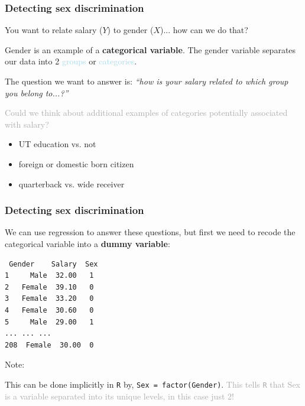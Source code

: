 \documentclass{beamer}
\newcommand{\bo}[1]{\textcolor{burntorange}{#1}}
\newcommand{\lb}[1]{\textcolor{lightblue}{#1}}
\newcommand{\dg}[1]{\textcolor{darkgray}{#1}}
\newcommand{\sk}{\vspace{.5cm}}
\newcommand{\skoo}{\vspace{.2in}}
\begin{document}
\begin{frame}
\frametitle{Detecting sex discrimination}
You want to relate salary ($Y$) to gender ($X$)...  how can we do that?

\skoo

Gender is an example of a {\bo{\bf categorical variable}}. The gender variable separates our data into 2 \lb{groups} or \lb{categories}. \\ \sk 

The question we want to answer is: {\it ``how is your salary related to which group you belong to...?''}  

\skoo \pause

\dg{Could we think about additional examples of categories potentially associated with salary?} \vspace{2mm} 
\begin{itemize}
\item UT education vs. not
\item foreign or domestic born citizen
\item quarterback vs. wide receiver 
\end{itemize}
\end{frame}


\begin{frame}[containsverbatim]
\frametitle{Detecting sex discrimination}


We can use \bo{regression} to answer these questions, but first we need to recode the categorical variable into a {\bo{\bf dummy variable}}:


\begin{verbatim}
 Gender    Salary  Sex
1     Male  32.00   1
2   Female  39.10   0
3   Female  33.20   0
4   Female  30.60   0
5     Male  29.00   1
... ... ... 
208  Female  30.00  0
\end{verbatim}	


{\color{red} Note:} \\ \vspace{2mm}

{\small
This can be done implicitly in {\tt R} by, {\tt Sex = factor(Gender)}. \dg{This tells {\tt R} that Sex is a variable separated into its unique levels, in this case just 2!}  }



\end{frame}


\end{document}
